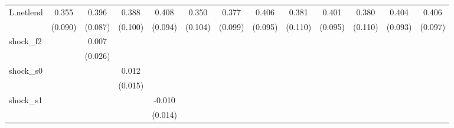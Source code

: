{\begin{tabular}{l*{12}{c}}
\addlinespace
L.netlend   &       0.355\sym{***}&       0.396\sym{***}&       0.388\sym{***}&       0.408\sym{***}&       0.350\sym{***}&       0.377\sym{***}&       0.406\sym{***}&       0.381\sym{***}&       0.401\sym{***}&       0.380\sym{***}&       0.404\sym{***}&       0.406\sym{***}\\
            &     (0.090)         &     (0.087)         &     (0.100)         &     (0.094)         &     (0.104)         &     (0.099)         &     (0.095)         &     (0.110)         &     (0.095)         &     (0.110)         &     (0.093)         &     (0.097)         \\
\addlinespace
shock\_f2    &                     &       0.007         &                     &                     &                     &                     &                     &                     &                     &                     &                     &                     \\
            &                     &     (0.026)         &                     &                     &                     &                     &                     &                     &                     &                     &                     &                     \\
\addlinespace
shock\_s0    &                     &                     &       0.012         &                     &                     &                     &                     &                     &                     &                     &                     &                     \\
            &                     &                     &     (0.015)         &                     &                     &                     &                     &                     &                     &                     &                     &                     \\
\addlinespace
shock\_s1    &                     &                     &                     &      -0.010         &                     &                     &                     &                     &                     &                     &                     &                     \\
            &                     &                     &                     &     (0.014)         &                     &                     &                     &                     &                     &                     &                     &                     \\

\end{tabular}}
